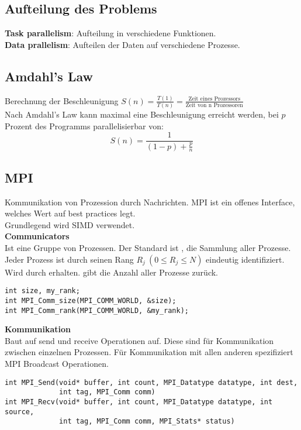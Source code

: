 \subsection{Aufteilung des Problems}%
\label{pp:sub:aufteilung-des-problems}
\textbf{Task parallelism}: Aufteilung in verschiedene Funktionen.\\
\textbf{Data prallelism}: Aufteilen der Daten auf verschiedene Prozesse.\\

\subsection{Amdahl's Law}%
\label{pp:sub:amdahls-law}
Berechnung der Beschleunigung \(S(n) = \frac{T(1)}{T(n)} = \frac{\text{Zeit eines Prozessors}}{\text{Zeit von n Prozessoren}}\)\\
Nach Amdahl's Law kann maximal eine Beschleunigung erreicht werden, bei \(p\) Prozent des Programms parallelisierbar von:
\[S(n) = \frac{1}{(1-p) + \frac{p}{n}}\]

\subsection{MPI}%
\label{pp:sub:mpi}
Kommunikation von Prozession durch Nachrichten.
MPI ist ein offenes Interface, welches Wert auf best practices legt.\\
Grundlegend wird SIMD verwendet.\\

\textbf{Communicators}\\
Ist eine Gruppe von Prozessen. Der Standard ist , die Sammlung aller Prozesse.\\
Jeder Prozess ist durch seinen Rang \(R_j\ (0 \leq R_j \leq N) \) eindeutig identifiziert. Wird durch  erhalten.
 gibt die Anzahl aller Prozesse zurück.
\begin{lstlisting}
int size, my_rank;
int MPI_Comm_size(MPI_COMM_WORLD, &size);
int MPI_Comm_rank(MPI_COMM_WORLD, &my_rank);
\end{lstlisting}

\textbf{Kommunikation}\\
Baut auf send und receive Operationen auf. Diese sind für Kommunikation zwischen einzelnen Prozessen.
Für Kommunikation mit allen anderen spezifiziert MPI Broadcast Operationen.
\begin{lstlisting}
int MPI_Send(void* buffer, int count, MPI_Datatype datatype, int dest,
             int tag, MPI_Comm comm)
int MPI_Recv(void* buffer, int count, MPI_Datatype datatype, int source,
             int tag, MPI_Comm comm, MPI_Stats* status)
\end{lstlisting}

